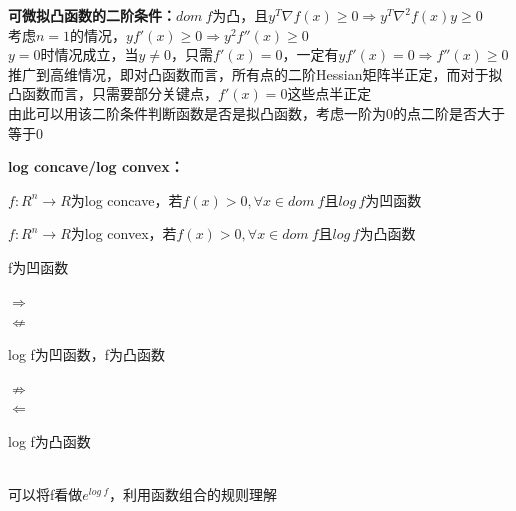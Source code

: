 \documentclass[11pt]{ctexart}         %
\newcommand{\rebacklinespread}[1][-12pt]{\vspace{#1}}
\newcommand{\dom}[1]{$dom\ #1$}
\newcommand{\sune}{\parbox{1em}{$ \Rightarrow $\\ [-10pt] $ \nLeftarrow $}} %
\newcommand{\usne}{\parbox{1em}{$ \nRightarrow $\\ [-10pt] $ \Leftarrow $}} %
\newcommand{\paint}[2][red]{{\color{#1}#2}} %
\begin{document}
\textbf{可微拟凸函数的二阶条件：}\dom{f}为凸，且$ y^T\nabla f(x)\geq 0\Rightarrow y^T\nabla^2f(x)y\geq 0 $\\
考虑$ n=1 $的情况，$ yf' (x)\geq 0\Rightarrow y^2f''(x)\geq 0 $\\
$ y=0 $时情况成立，当$ y\neq 0 $，只需$ f'(x)=0 $，一定有$ yf' (x)=0\Rightarrow f''(x)\geq 0 $\\
推广到高维情况，即对凸函数而言，所有点的二阶Hessian矩阵半正定，而对于拟凸函数而言，只需要部分关键点，$ f'(x)=0 $这些点半正定\\
\paint{由此可以用该二阶条件判断函数是否是拟凸函数，考虑一阶为0的点二阶是否大于等于0}

\textbf{log concave/log convex：}
\rebacklinespread
\begin{description}[itemsep=0pt,parsep=0pt,topsep=0pt]
	\item[log concave]$ f:R^n\to R $为log concave，若$ f(x)>0,\forall x\in dom\ f$且$ log\,f $为凹函数
	\item[log convex] $ f:R^n\to R $为log convex，若$ f(x)>0,\forall x\in dom\ f$且$ log\,f $为凸函数
\end{description}
\paint{f为凹函数\sune log f为凹函数，f为凸函数 \usne log f为凸函数}\\
可以将f看做$ e^{log\ f} $，利用函数组合的规则理解
\end{document}
